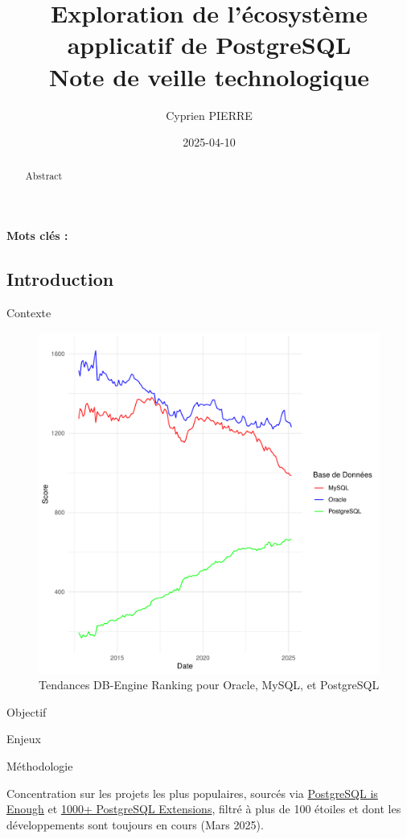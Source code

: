 \documentclass[a4paper,12pt]{article}
\author{Cyprien PIERRE \orcidlink{0009-0009-9040-6795}}
\date{2025-04-10}
\title{Exploration de l'écosystème applicatif de PostgreSQL\\\medskip
\large Note de veille technologique}
\begin{document}
\maketitle
\begin{abstract}
Abstract
\end{abstract}

\textbf{Mots clés : }

\begin{multicols*}{2}
\section*{Introduction}
\label{sec:org011d216}
Contexte

\begin{figure}[H]
\centering
\includegraphics[width=.9\linewidth]{charts/top5.pdf}
\caption{\label{fig:orga650cb8}Tendances DB-Engine Ranking pour Oracle, MySQL, et PostgreSQL}
\end{figure} 

Objectif 

Enjeux

Méthodologie

Concentration sur les projets les plus populaires, sourcés via \href{https://gist.github.com/cpursley/c8fb81fe8a7e5df038158bdfe0f06dbb}{PostgreSQL is Enough} et \href{https://gist.github.com/joelonsql/e5aa27f8cc9bd22b8999b7de8aee9d47}{1000+ PostgreSQL Extensions}, filtré à plus de 100 étoiles et dont les développements sont toujours en cours (Mars 2025).

\end{multicols*}
\end{document}
